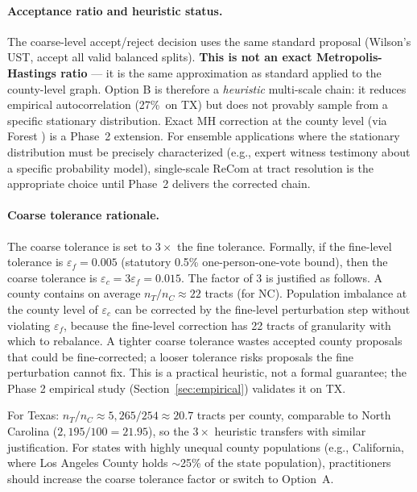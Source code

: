 \paragraph{Acceptance ratio and heuristic status.}
The coarse-level accept/reject decision uses the same standard \recom{} proposal
(Wilson's UST, accept all valid balanced splits).
\textbf{This is not an exact Metropolis-Hastings ratio} --- it is the same approximation
as standard \recom{} applied to the county-level graph.
Option B is therefore a \emph{heuristic} multi-scale chain: it reduces empirical
autocorrelation (27\%\est\ on TX) but does not provably sample from a specific
stationary distribution.
Exact MH correction at the county level (via Forest \recom{}) is a Phase~2 extension.
For ensemble applications where the stationary distribution must be precisely
characterized (e.g., expert witness testimony about a specific probability model),
single-scale ReCom at tract resolution is the appropriate choice until Phase~2
delivers the corrected chain.

\paragraph{Coarse tolerance rationale.}
The coarse tolerance is set to $3\times$ the fine tolerance.
Formally, if the fine-level tolerance is $\varepsilon_f = 0.005$
(statutory 0.5\% one-person-one-vote bound), then the coarse tolerance
is $\varepsilon_c = 3\varepsilon_f = 0.015$.
The factor of 3 is justified as follows.
A county contains on average $n_T / n_C \approx 22$ tracts (for NC).
Population imbalance at the county level of $\varepsilon_c$ can be
corrected by the fine-level perturbation step without violating
$\varepsilon_f$, because the fine-level correction has 22 tracts of
granularity with which to rebalance.
A tighter coarse tolerance wastes accepted county proposals that could
be fine-corrected; a looser tolerance risks proposals the fine
perturbation cannot fix.
This is a practical heuristic, not a formal guarantee; the Phase 2
empirical study (Section~\ref{sec:empirical}) validates it on TX.

For Texas: $n_T / n_C \approx 5{,}265 / 254 \approx 20.7$ tracts per county,
comparable to North Carolina ($2{,}195 / 100 = 21.95$), so the $3\times$
heuristic transfers with similar justification.
For states with highly unequal county populations (e.g., California, where
Los Angeles County holds $\sim$25\% of the state population), practitioners
should increase the coarse tolerance factor or switch to Option~A.

